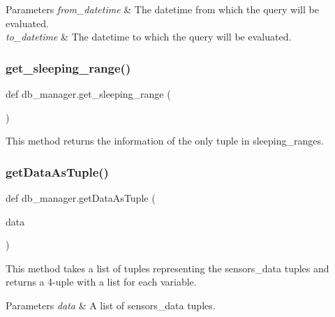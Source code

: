\begin{DoxyParams}{Parameters}
{\em from\+\_\+datetime} & The datetime from which the query will be evaluated. \\
\hline
{\em to\+\_\+datetime} & The datetime to which the query will be evaluated. \\
\hline
\end{DoxyParams}
\mbox{\label{namespacedb__manager_a2d024bbfed2a6a3a23a5e4084156cfcf}} 
\subsubsection{\texorpdfstring{get\+\_\+sleeping\+\_\+range()}{get\_sleeping\_range()}}
{\footnotesize\ttfamily def db\+\_\+manager.\+get\+\_\+sleeping\+\_\+range (\begin{DoxyParamCaption}{ }\end{DoxyParamCaption})}



This method returns the information of the only tuple in \textquotesingle{}sleeping\+\_\+ranges\textquotesingle{}. 

\mbox{\label{namespacedb__manager_aede421c7e85653db00e136c3a8b5afe3}} 
\subsubsection{\texorpdfstring{get\+Data\+As\+Tuple()}{getDataAsTuple()}}
{\footnotesize\ttfamily def db\+\_\+manager.\+get\+Data\+As\+Tuple (\begin{DoxyParamCaption}\item[{}]{data }\end{DoxyParamCaption})}



This method takes a list of tuples representing the \textquotesingle{}sensors\+\_\+data\textquotesingle{} tuples and returns a 4-\/uple with a list for each variable. 


\begin{DoxyParams}{Parameters}
{\em data} & A list of \textquotesingle{}sensors\+\_\+data\textquotesingle{} tuples. \\
\hline
\end{DoxyParams}
\mbox{\label{namespacedb__manager_a2fa0c3f4bc530922125dabd2714bb28e}} 
